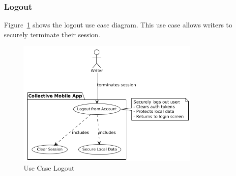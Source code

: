 \subsubsection{Logout}

Figure~\ref{fig:usecase-logout} shows the logout use case diagram. This use case allows writers to securely terminate their session.

\begin{figure}[H]
\centering
\includegraphics[width=0.8\textwidth]{files/imgs/usecase_U9ojaazFmp.png}
\caption{Use Case Logout}
\label{fig:usecase-logout}
\end{figure}

